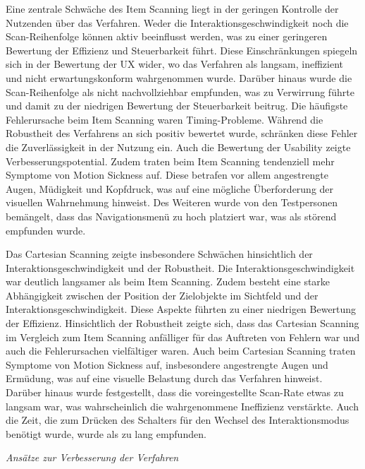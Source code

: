 Eine zentrale Schwäche des Item Scanning liegt in der geringen Kontrolle der Nutzenden über das Verfahren. Weder die Interaktionsgeschwindigkeit noch die Scan-Reihenfolge können aktiv beeinflusst werden, was zu einer geringeren Bewertung der Effizienz und Steuerbarkeit führt. Diese Einschränkungen spiegeln sich in der Bewertung der UX wider, wo das Verfahren als langsam, ineffizient und nicht erwartungskonform wahrgenommen wurde. Darüber hinaus wurde die Scan-Reihenfolge als nicht nachvollziehbar empfunden, was zu Verwirrung führte und damit zu der niedrigen Bewertung der Steuerbarkeit beitrug.
Die häufigste Fehlerursache beim Item Scanning waren Timing-Probleme. Während die Robustheit des Verfahrens an sich positiv bewertet wurde, schränken diese Fehler die Zuverlässigkeit in der Nutzung ein. Auch die Bewertung der Usability zeigte Verbesserungspotential.
Zudem traten beim Item Scanning tendenziell mehr Symptome von Motion Sickness auf. Diese betrafen vor allem angestrengte Augen, Müdigkeit und Kopfdruck, was auf eine mögliche Überforderung der visuellen Wahrnehmung hinweist. Des Weiteren wurde von den Testpersonen bemängelt, dass das Navigationsmenü zu hoch platziert war, was als störend empfunden wurde. 

Das Cartesian Scanning zeigte insbesondere Schwächen hinsichtlich der Interaktionsgeschwindigkeit und der Robustheit. Die Interaktionsgeschwindigkeit war deutlich langsamer als beim Item Scanning. Zudem besteht eine starke Abhängigkeit zwischen der Position der Zielobjekte im Sichtfeld und der Interaktionsgeschwindigkeit. Diese Aspekte führten zu einer niedrigen Bewertung der Effizienz. Hinsichtlich der Robustheit zeigte sich, dass das Cartesian Scanning im Vergleich zum Item Scanning anfälliger für das Auftreten von Fehlern war und auch die Fehlerursachen vielfältiger waren. 
Auch beim Cartesian Scanning traten Symptome von Motion Sickness auf, insbesondere angestrengte Augen und Ermüdung, was auf eine visuelle Belastung durch das Verfahren hinweist.
Darüber hinaus wurde festgestellt, dass die voreingestellte Scan-Rate etwas zu langsam war, was wahrscheinlich die wahrgenommene Ineffizienz verstärkte. Auch die Zeit, die zum Drücken des Schalters für den Wechsel des Interaktionsmodus benötigt wurde, wurde als zu lang empfunden.

\textit{Ansätze zur Verbesserung der Verfahren}

